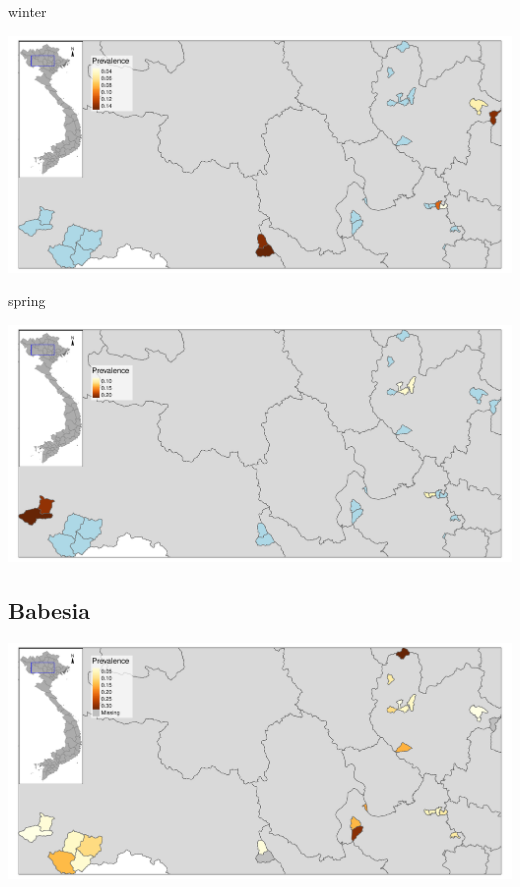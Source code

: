 \begin{frame}
winter\\
\begin{center}
\includegraphics[width=1\textwidth]{map03_winter.pdf}
\end{center}
\end{frame}


\begin{frame}
spring\\
\begin{center}
\includegraphics[width=1\textwidth]{map03_spring.pdf}
\end{center}
\end{frame}

\subsection{Babesia}
\begin{frame}
\begin{center}
\includegraphics[width=1\textwidth]{map04.pdf}
\end{center}
\end{frame}

